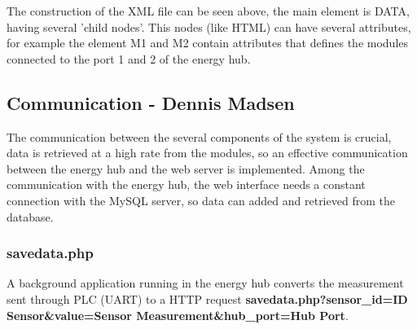 The construction of the XML file can be seen above, the main element is DATA, having several 'child nodes'. This nodes (like HTML) can have several attributes, for example the element M1 and M2 contain attributes that defines the modules connected to the port 1 and 2 of the energy hub.

\subsection{Communication - Dennis Madsen}
The communication between the several components of the system is crucial, data is retrieved at a high rate from the modules, so an effective communication between the energy hub and the web server is implemented. Among the communication with the energy hub, the web interface needs a constant connection with the MySQL server, so data can added and retrieved from the database.

\subsubsection{savedata.php}
A background application running in the energy hub converts the measurement sent through PLC (UART) to a HTTP request \textbf{savedata.php?sensor\_id=ID Sensor\&value=Sensor Measurement\&hub\_port=Hub Port}.

